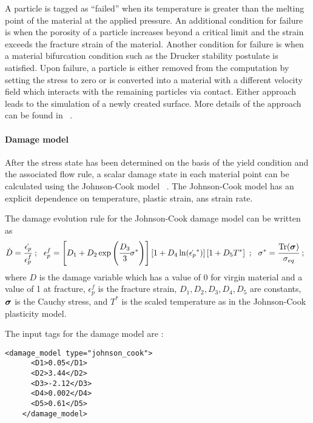   A particle is tagged as ``failed'' when its temperature is greater than the
  melting point of the material at the applied pressure.  An additional
  condition for failure is when the porosity of a particle increases beyond a
  critical limit and the strain exceeds the fracture strain of the material.
  Another condition for failure is when a material bifurcation
  condition such as the Drucker stability postulate is satisfied.  Upon failure,
  a particle is either removed from the computation by setting the stress to
  zero or is converted into a material with a different velocity field
  which interacts with the remaining particles via contact.  Either approach
  leads to the simulation of a newly created surface.  More details of the
  approach can be found in ~\cite{Banerjee04a,Banerjee04c,Banerjee05}.

  \paragraph{Damage model}
  After the stress state has been determined on the basis of the yield condition
  and the associated flow rule, a scalar damage state in each material point can
  be calculated using the Johnson-Cook model ~\cite{Johnson85}.
  The Johnson-Cook model has an explicit dependence on temperature, plastic
  strain, ans strain rate.

  The damage evolution rule for the Johnson-Cook damage model can be written as
  \begin{equation}
    \dot{D} = \cfrac{\dot{\epsilon_p}}{\epsilon_p^f} ~;~~
    \epsilon_p^f = 
      \left[D_1 + D_2 \exp \left(\cfrac{D_3}{3} \sigma^*\right)\right]
      \left[1+ D_4 \ln(\dot{\epsilon_p}^*)\right]
      \left[1+D_5 T^*\right]~;~~
    \sigma^*= \cfrac{\text{Tr}(\Bsig)}{\sigma_{eq}}~;~~
  \end{equation}
  where $D$ is the damage variable which has a value of 0 for virgin material
  and a value of 1 at fracture, $\epsilon_p^f$ is the fracture strain,
  $D_1, D_2, D_3, D_4, D_5$ are constants, $\Bsig$ is the Cauchy stress, and
  $T^*$ is the scaled temperature as in the Johnson-Cook plasticity model.

  The input tags for the damage model are :
  \begin{Verbatim}[fontsize=\footnotesize]
    <damage_model type="johnson_cook">
      <D1>0.05</D1>
      <D2>3.44</D2>
      <D3>-2.12</D3>
      <D4>0.002</D4>
      <D5>0.61</D5>
    </damage_model>
  \end{Verbatim}


